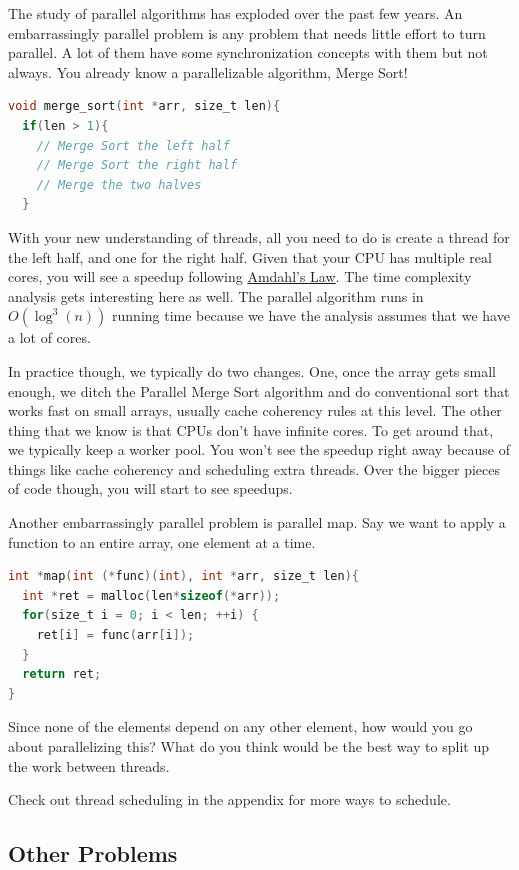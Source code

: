 The study of parallel algorithms has exploded over the past few years.
An embarrassingly parallel problem is any problem that needs little effort to turn parallel.
A lot of them have some synchronization concepts with them but not always.
You already know a parallelizable algorithm, Merge Sort!

\begin{lstlisting}[language=C]
void merge_sort(int *arr, size_t len){
  if(len > 1){
    // Merge Sort the left half
    // Merge Sort the right half
    // Merge the two halves
  }
\end{lstlisting}

With your new understanding of threads, all you need to do is create a thread for the left half, and one for the right half.
Given that your CPU has multiple real cores, you will see a speedup following \href{https://en.wikipedia.org/wiki/Amdahl's_law}{Amdahl's Law}.
The time complexity analysis gets interesting here as well.
The parallel algorithm runs in $O(\log^3(n))$ running time because we have the analysis assumes that we have a lot of cores.

In practice though, we typically do two changes.
One, once the array gets small enough, we ditch the Parallel Merge Sort algorithm and do conventional sort that works fast on small arrays, usually cache coherency rules at this level.
The other thing that we know is that CPUs don't have infinite cores.
To get around that, we typically keep a worker pool.
You won't see the speedup right away because of things like cache coherency and scheduling extra threads.
Over the bigger pieces of code though, you will start to see speedups.

Another embarrassingly parallel problem is parallel map.
Say we want to apply a function to an entire array, one element at a time.

\begin{lstlisting}[language=C]
int *map(int (*func)(int), int *arr, size_t len){
  int *ret = malloc(len*sizeof(*arr));
  for(size_t i = 0; i < len; ++i) {
    ret[i] = func(arr[i]);
  }
  return ret;
}
\end{lstlisting}

Since none of the elements depend on any other element, how would you go about parallelizing this?
What do you think would be the best way to split up the work between threads.

Check out thread scheduling in the appendix for more ways to schedule.

\subsection{Other Problems}

